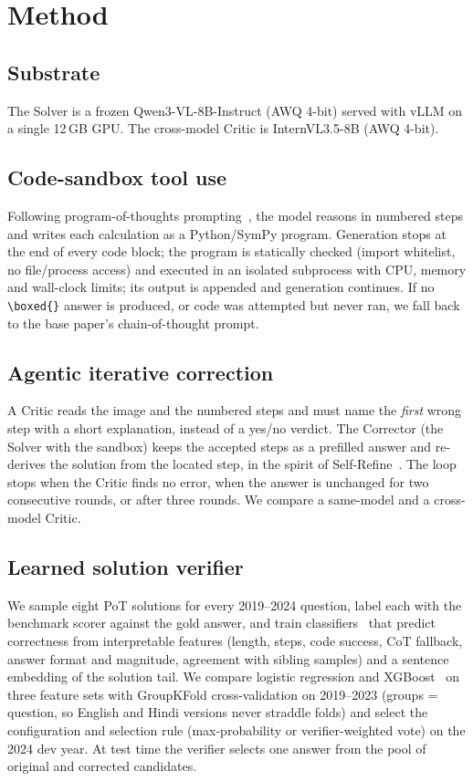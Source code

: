 \documentclass[conference]{IEEEtran}
\begin{document}
\section{Method}
\subsection{Substrate}
The Solver is a frozen Qwen3-VL-8B-Instruct (AWQ 4-bit) served with vLLM on a
single 12\,GB GPU. The cross-model Critic is InternVL3.5-8B (AWQ 4-bit).

\subsection{Code-sandbox tool use}
Following program-of-thoughts prompting~\cite{pot}, the model reasons in numbered
steps and writes each calculation as a Python/SymPy program. Generation stops at
the end of every code block; the program is statically checked (import
whitelist, no file/process access) and executed in an isolated subprocess with
CPU, memory and wall-clock limits; its output is appended and generation
continues. If no \verb|\boxed{}| answer is produced, or code was attempted but
never ran, we fall back to the base paper's chain-of-thought prompt.

\subsection{Agentic iterative correction}
A Critic reads the image and the numbered steps and must name the \emph{first}
wrong step with a short explanation, instead of a yes/no verdict. The Corrector
(the Solver with the sandbox) keeps the accepted steps as a prefilled answer and
re-derives the solution from the located step, in the spirit of
Self-Refine~\cite{selfrefine}. The loop stops when the Critic finds no error,
when the answer is unchanged for two consecutive rounds, or after three rounds.
We compare a same-model and a cross-model Critic.

\subsection{Learned solution verifier}
We sample eight PoT solutions for every 2019--2024 question, label each with the
benchmark scorer against the gold answer, and train classifiers~\cite{cobbe}
that predict correctness from interpretable features (length, steps, code
success, CoT fallback, answer format and magnitude, agreement with sibling
samples) and a sentence embedding of the solution tail. We compare logistic
regression and XGBoost~\cite{xgboost} on three feature sets with GroupKFold
cross-validation on 2019--2023 (groups = question, so English and Hindi versions
never straddle folds) and select the configuration and selection rule
(max-probability or verifier-weighted vote) on the 2024 dev year. At test time
the verifier selects one answer from the pool of original and corrected
candidates.
\end{document}
